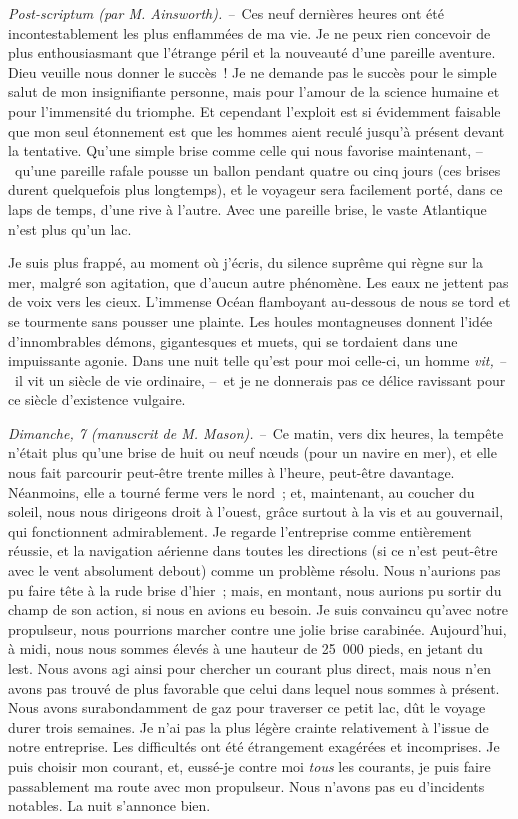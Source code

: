 \documentclass[french,twoside]{book} %
\begin{document}
\emph{Post-scriptum (par M. Ainsworth). –} Ces neuf dernières heures ont été incontestablement les plus enflammées de ma vie. Je ne peux rien concevoir de plus enthousiasmant que l’étrange péril et la nouveauté d’une pareille aventure. Dieu veuille nous donner le succès ! Je ne demande pas le succès pour le simple salut de mon insignifiante personne, mais pour l’amour de la science humaine et pour l’immensité du triomphe. Et cependant l’exploit est si évidemment faisable que mon seul étonnement est que les hommes aient reculé jusqu’à présent devant la tentative. Qu’une simple brise comme celle qui nous favorise maintenant, – qu’une pareille rafale pousse un ballon pendant quatre ou cinq jours (ces brises durent quelquefois plus longtemps), et le voyageur sera facilement porté, dans ce laps de temps, d’une rive à l’autre. Avec une pareille brise, le vaste Atlantique n’est plus qu’un lac.\par
Je suis plus frappé, au moment où j’écris, du silence suprême qui règne sur la mer, malgré son agitation, que d’aucun autre phénomène. Les eaux ne jettent pas de voix vers les cieux. L’immense Océan flamboyant au-dessous de nous se tord et se tourmente sans pousser une plainte. Les houles montagneuses donnent l’idée d’innombrables démons, gigantesques et muets, qui se tordaient dans une impuissante agonie. Dans une nuit telle qu’est pour moi celle-ci, un homme \emph{vit, –} il vit un siècle de vie ordinaire, – et je ne donnerais pas ce délice ravissant pour ce siècle d’existence vulgaire.\par
\emph{Dimanche, 7 (manuscrit de M. Mason). –} Ce matin, vers dix heures, la tempête n’était plus qu’une brise de huit ou neuf nœuds (pour un navire en mer), et elle nous fait parcourir peut-être trente milles à l’heure, peut-être davantage. Néanmoins, elle a tourné ferme vers le nord ; et, maintenant, au coucher du soleil, nous nous dirigeons droit à l’ouest, grâce surtout à la vis et au gouvernail, qui fonctionnent admirablement. Je regarde l’entreprise comme entièrement réussie, et la navigation aérienne dans toutes les directions (si ce n’est peut-être avec le vent absolument debout) comme un problème résolu. Nous n’aurions pas pu faire tête à la rude brise d’hier ; mais, en montant, nous aurions pu sortir du champ de son action, si nous en avions eu besoin. Je suis convaincu qu’avec notre propulseur, nous pourrions marcher contre une jolie brise carabinée. Aujourd’hui, à midi, nous nous sommes élevés à une hauteur de 25 000 pieds, en jetant du lest. Nous avons agi ainsi pour chercher un courant plus direct, mais nous n’en avons pas trouvé de plus favorable que celui dans lequel nous sommes à présent. Nous avons surabondamment de gaz pour traverser ce petit lac, dût le voyage durer trois semaines. Je n’ai pas la plus légère crainte relativement à l’issue de notre entreprise. Les difficultés ont été étrangement exagérées et incomprises. Je puis choisir mon courant, et, eussé-je contre moi \emph{tous} les courants, je puis faire passablement ma route avec mon propulseur. Nous n’avons pas eu d’incidents notables. La nuit s’annonce bien.\par
\end{document}
